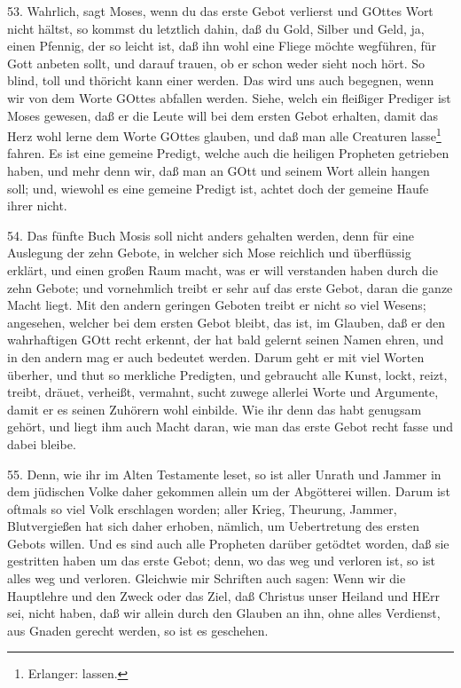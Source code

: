 53. Wahrlich, sagt Moses, wenn du das erste Gebot verlierst und GOttes Wort nicht hältst, so kommst du letztlich dahin, daß du Gold, Silber und Geld, ja, einen Pfennig, der so leicht ist, daß ihn wohl eine Fliege möchte wegführen, für Gott anbeten sollt, und darauf trauen, ob er schon weder sieht noch hört. So blind, toll und thöricht kann einer werden. Das wird uns auch begegnen, wenn wir von dem Worte GOttes abfallen werden. Siehe, welch ein fleißiger Prediger ist Moses gewesen, daß er die Leute will bei dem ersten Gebot erhalten, damit das Herz wohl lerne dem Worte GOttes glauben, und daß man alle Creaturen lasse\footnote{Erlanger: lassen.} fahren. Es ist eine gemeine Predigt, welche auch die heiligen Propheten getrieben haben, und mehr denn wir, daß man an GOtt und seinem Wort allein hangen soll; und, wiewohl es eine gemeine Predigt ist, achtet doch der gemeine Haufe ihrer nicht.

54. Das fünfte Buch Mosis soll nicht anders gehalten werden, denn für eine Auslegung der zehn Gebote, in welcher sich Mose reichlich und überflüssig erklärt, und einen großen Raum macht, was er will verstanden haben durch die zehn Gebote; und vornehmlich treibt er sehr auf das erste Gebot, daran die ganze Macht liegt. Mit den andern geringen Geboten treibt er nicht so viel Wesens; angesehen, welcher bei dem ersten Gebot bleibt, das ist, im Glauben, daß er den wahrhaftigen GOtt recht erkennt, der hat bald gelernt seinen Namen ehren, und in den andern mag er auch bedeutet werden. Darum geht er mit viel Worten überher, und thut so merkliche Predigten, und gebraucht alle Kunst, lockt, reizt, treibt, dräuet, verheißt, vermahnt, sucht zuwege allerlei Worte und Argumente, damit er es seinen Zuhörern wohl einbilde. Wie ihr denn das habt genugsam gehört, und liegt ihm auch Macht daran, wie man das erste Gebot recht fasse und dabei bleibe.

55. Denn, wie ihr im Alten Testamente leset, so ist aller Unrath und Jammer in dem jüdischen Volke daher gekommen allein um der Abgötterei willen. Darum ist oftmals so viel Volk erschlagen worden; aller Krieg, Theurung, Jammer, Blutvergießen hat sich daher erhoben, nämlich, um Uebertretung des ersten Gebots willen. Und es sind auch alle Propheten darüber getödtet worden, daß sie gestritten haben um das erste Gebot; denn, wo das weg und verloren ist, so ist alles weg und verloren. Gleichwie mir Schriften auch sagen: Wenn wir die Hauptlehre und den Zweck oder das Ziel, daß Christus unser Heiland und HErr sei, nicht haben, daß wir allein durch den Glauben an ihn, ohne alles Verdienst, aus Gnaden gerecht werden, so ist es geschehen.

